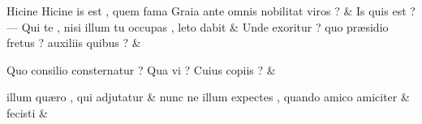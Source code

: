 \documentclass[12pt,onecolumn,twoside,a4paper]{memoir}
\begin{document}
\begin{pairs}
\begin{Leftside}
                              Hicine
                              {Hicine}
                              is
                              est
                              ,
                              quem
                              fama
                              Graia
                              ante
                              omnis
                              nobilitat
                              viros
                              ? \&
                         \stanza {}
                     Is
                              quis
                              est
                              ?
                              —
                              Qui
                              te
                              ,
                              nisi
                              illum
                              tu
                              occupas
                              ,
                              leto
                              dabit \&
                         \stanza {}Unde
                              exoritur
                              ?
                              quo
                              præsidio
                              fretus
                              ?
                              auxiliis
                              quibus
                              ? & 
                     
                              Quo
                              consilio
                              consternatur
                              ?
                              Qua
                              vi
                              ?
                              Cuius
                              copiis
                              ? \&
                         \stanza {}
                     
                              illum
                              quæro
                              ,
                              qui
                              adjutatur \&
                         \stanza {}nunc
                              ne
                              illum
                              expectes
                              ,
                              quando
                              amico
                              amiciter & 
                     fecisti \&
                         \stanza {}
                     

\end{Leftside}
\end{pairs}
\end{document}
